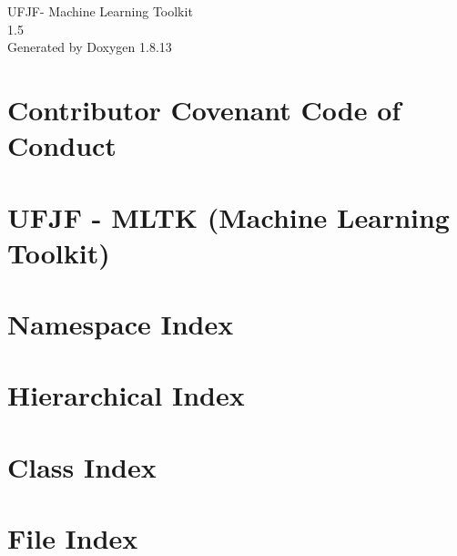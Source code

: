 \documentclass[twoside]{book}
\newcommand{\+}{\discretionary{\mbox{\scriptsize$\hookleftarrow$}}{}{}}
\newcommand{\clearemptydoublepage}{%
  \newpage{\pagestyle{empty}\cleardoublepage}%
}
\begin{document}
\hypersetup{pageanchor=false,
             bookmarksnumbered=true,
             pdfencoding=unicode
            }
\begin{titlepage}
\vspace*{7cm}
\begin{center}%
{\Large U\+F\+J\+F-\/ Machine Learning Toolkit \\[1ex]\large 1.\+5 }\\
\vspace*{1cm}
{\large Generated by Doxygen 1.8.13}\\
\end{center}
\end{titlepage}
\clearemptydoublepage
{}
\tableofcontents
\clearemptydoublepage
{}
\hypersetup{pageanchor=true}

\chapter{Contributor Covenant Code of Conduct}
\label{md__home_mateus558__documents__machine-_learning-_toolkit__c_o_d_e__o_f__c_o_n_d_u_c_t}

\chapter{U\+F\+JF -\/ M\+L\+TK (Machine Learning Toolkit)}
\label{md__home_mateus558__documents__machine-_learning-_toolkit__r_e_a_d_m_e}

\chapter{Namespace Index}

\chapter{Hierarchical Index}

\chapter{Class Index}

\chapter{File Index}

\end{document}
